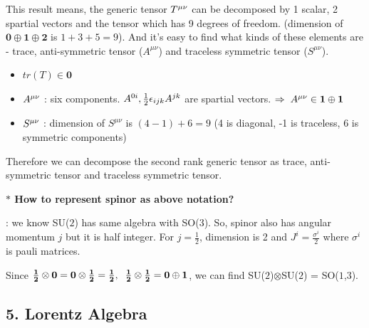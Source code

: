 \documentclass[11pt,letterpaper]{article}
\begin{document}

\vs

This result means, the generic tensor $\tensor{T}{^\mu ^\nu}$ can be decomposed by 1 scalar, 2 spartial vectors and the tensor which has 9 degrees of freedom.
(dimension of $\mathbf{0}\oplus\mathbf{1}\oplus\mathbf{2}$ is $1 + 3 + 5 = 9$). And it's easy to find what kinds of these elements are - trace, anti-symmetric tensor ($A^{\mu\nu}$)
and traceless symmetric tensor ($S^{\mu\nu}$).

\begin{itemize}
 \item $tr(T) \in \mathbf{0}$
 \item $\tensor{A}{^\mu ^\nu}$ : six components. $\tensor{A}{^0 ^i}, \frac{1}{2}\eps_{ijk}\tensor{A}{^j ^k}$ are spartial vectors. $\Rightarrow \hs \tensor{A}{^\mu ^\nu} \in
 \mathbf{1}\oplus\mathbf{1}$
 \item $\tensor{S}{^\mu ^\nu}$ : dimension of $S^{\mu\nu}$ is $(4-1)+6 = 9$ (4 is diagonal, -1 is traceless, 6 is symmetric components)
\end{itemize}

\vs

Therefore we can decompose the second rank generic tensor as trace, anti-symmetric tensor and traceless symmetric tensor.

\vs

\textbf{$*$ How to represent spinor as above notation?}

: we know SU($2$) has same algebra with SO($3$).\footnotemark[2]
So, spinor also has angular momentum $j$ but it is half integer. For $j=\frac{1}{2}$, dimension is 2 and $J^i = \frac{\sigma^i}{2}$ where $\sigma^i$ is pauli matrices.

Since $\mathbf{\frac{1}{2}}\otimes\mathbf{0} = \mathbf{0}\otimes\mathbf{\frac{1}{2}} = \mathbf{\frac{1}{2}}\Com \hs \mathbf{\frac{1}{2}}\otimes\mathbf{\frac{1}{2}} = 
\mathbf{0}\oplus\mathbf{1}$, we can find SU($2$)$\otimes$SU($2$) = SO($1$,$3$).

\newpage

\subsection*{5. Lorentz Algebra}
\end{document}
